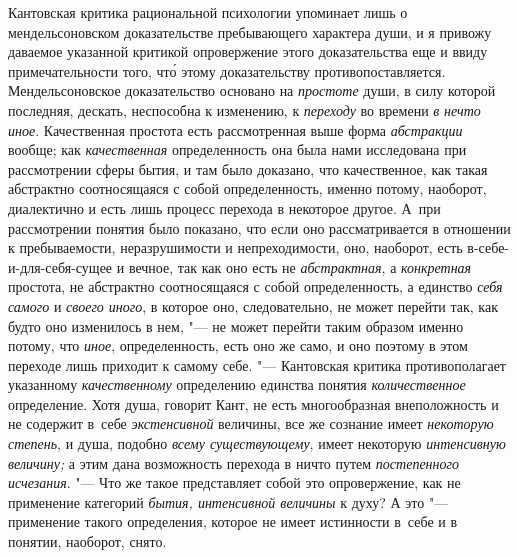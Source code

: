 Кантовская критика рациональной психологии упоминает лишь о
мендельсоновском доказательстве пребывающего характера души, и я привожу
даваемое указанной критикой опровержение этого доказательства еще и ввиду
примечательности того, чт\'{о} этому доказательству
противопоставляется.
Мендельсоновское доказательство основано на {\em простоте} души, в
силу которой последняя, дескать, неспособна к изменению, к
{\em переходу} во времени {\em в} {\em нечто иное}.
Качественная простота есть рассмотренная выше форма
{\em абстракции} вообще; как {\em качественная}
определенность она была нами исследована при рассмотрении
сферы бытия, и там было доказано, что качественное, как такая абстрактно
соотносящаяся с собой определенность, именно потому, наоборот, диалектично
и есть лишь процесс перехода в некоторое другое. А~при рассмотрении понятия
было показано, что если оно рассматривается в отношении к пребываемости,
неразрушимости и непреходимости, оно, наоборот, есть
в-себе-и-для-себя-сущее и вечное, так как оно есть не
{\em абстрактная}, а {\em конкретная}
простота, не абстрактно соотносящаяся с собой определенность,
а единство {\em себя самого} и {\em своего иного},
в которое оно, следовательно, не может перейти так,
как будто оно изменилось в нем, "--- не может перейти таким
образом именно потому, что {\em иное},
определенность, есть оно же само, и оно поэтому в этом
переходе лишь приходит к самому себе. "--- Кантовская критика
противополагает указанному {\em качественному}
определению единства понятия {\em количественное}
определение. Хотя душа, говорит Кант, не есть многообразная
внеположность и не содержит в~себе {\em экстенсивной}
величины, все же сознание имеет {\em некоторую степень},
и душа, подобно {\em всему существующему}, имеет некоторую
{\em интенсивную величину;} а этим дана возможность перехода в ничто путем
{\em постепенного исчезания}. "---
Что же такое представляет собой это опровержение, как не
применение категорий {\em бытия, интенсивной величины} к духу? А это
"--- применение такого определения, которое не имеет истинности
в~себе и в понятии, наоборот, снято.

